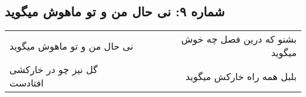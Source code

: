 \begin{center}
\section*{شماره ۹: نی حال من و تو ماهوش میگوید}
\label{sec:009}
\begin{longtable}{l p{0.5cm} r}
نی حال من و تو ماهوش میگوید
&&
بشنو که درین فصل چه خوش میگوید
\\
گل نیز چو در خارکشی افتادست
&&
بلبل همه راه خارکش میگوید
\\
\end{longtable}
\end{center}
